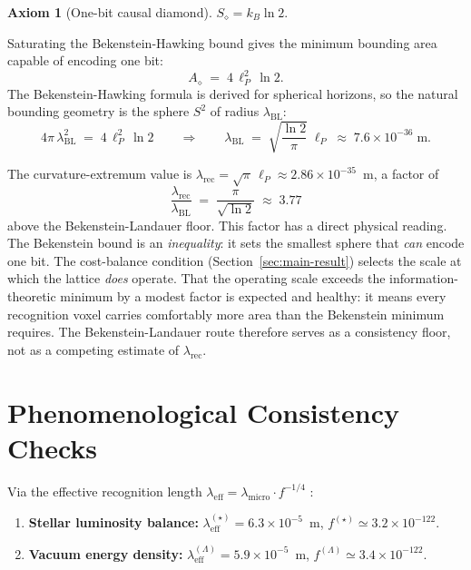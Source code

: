 \documentclass[12pt]{article}
\theoremstyle{definition}
\newtheorem{axiomRS}[theorem]{Axiom}
\theoremstyle{remark}
\begin{document}
\begin{axiomRS}[One-bit causal diamond]
$S_\diamond = k_B \ln 2$.
\end{axiomRS}

Saturating the Bekenstein-Hawking bound gives the minimum bounding area
capable of encoding one bit:
\begin{equation}
  A_\diamond \;=\; 4\,\ell_P^2\,\ln 2.
\end{equation}
The Bekenstein-Hawking formula is derived for spherical horizons, so the
natural bounding geometry is the sphere $S^2$ of radius
$\lambda_{\mathrm{BL}}$:
\begin{equation}
  4\pi\,\lambda_{\mathrm{BL}}^2 \;=\; 4\,\ell_P^2\,\ln 2
  \qquad\Longrightarrow\qquad
  \lambda_{\mathrm{BL}}
  \;=\; \sqrt{\frac{\ln 2}{\pi}}\;\ell_P
  \;\approx\; 7.6 \times 10^{-36}\;\mathrm{m}.
  \label{eq:lambda-BL}
\end{equation}

The curvature-extremum value is
$\lambda_{\mathrm{rec}} = \sqrt{\pi}\,\ell_P \approx 2.86 \times
10^{-35}$~m, a factor of
\begin{equation}
  \frac{\lambda_{\mathrm{rec}}}{\lambda_{\mathrm{BL}}}
  \;=\; \frac{\pi}{\sqrt{\ln 2}}
  \;\approx\; 3.77
\end{equation}
above the Bekenstein-Landauer floor. This factor has a direct
physical reading. The Bekenstein bound is an \emph{inequality}: it
sets the smallest sphere that \emph{can} encode one bit. The
cost-balance condition (Section~\ref{sec:main-result}) selects the
scale at which the lattice \emph{does} operate. That the operating
scale exceeds the information-theoretic minimum by a modest factor is
expected and healthy: it means every recognition voxel carries
comfortably more area than the Bekenstein minimum requires. The
Bekenstein-Landauer route therefore serves as a consistency floor, not
as a competing estimate of $\lambda_{\mathrm{rec}}$.

\section{Phenomenological Consistency Checks}
\label{sec:consistency}

Via the effective recognition length $\lambda_{\mathrm{eff}} =
\lambda_{\mathrm{micro}} \cdot f^{-1/4}$
\cite{Washburn2025DualDerivation}:

\begin{enumerate}
  \item \textbf{Stellar luminosity balance:}
    $\lambda_{\mathrm{eff}}^{(\star)} = 6.3 \times 10^{-5}$~m,
    $f^{(\star)} \simeq 3.2 \times 10^{-122}$.
  \item \textbf{Vacuum energy density:}
    $\lambda_{\mathrm{eff}}^{(\Lambda)} = 5.9 \times 10^{-5}$~m,
    $f^{(\Lambda)} \simeq 3.4 \times 10^{-122}$.
\end{enumerate}
\end{document}

